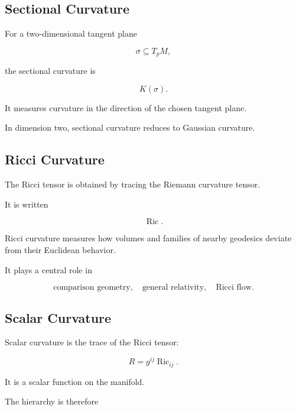 \subsection{Sectional Curvature}
\label{subsec:sectional-curvature-analysis}

For a two-dimensional tangent plane

\[
\sigma\subseteq T_pM,
\]

the sectional curvature is

\[
\boxed{
K(\sigma).
}
\]

It measures curvature in the direction of the chosen tangent plane.

In dimension two, sectional curvature reduces to Gaussian curvature.

\subsection{Ricci Curvature}
\label{subsec:ricci-curvature-analysis}

The Ricci tensor is obtained by tracing the Riemann curvature tensor.

It is written

\[
\boxed{
\operatorname{Ric}.
}
\]

Ricci curvature measures how volumes and families of nearby geodesics
deviate from their Euclidean behavior.

It plays a central role in

\[
\boxed{
\text{comparison geometry},
\quad
\text{general relativity},
\quad
\text{Ricci flow}.
}
\]

\subsection{Scalar Curvature}
\label{subsec:scalar-curvature-analysis}

Scalar curvature is the trace of the Ricci tensor:

\[
\boxed{
R
=
g^{ij}\operatorname{Ric}_{ij}.
}
\]

It is a scalar function on the manifold.

The hierarchy is therefore

